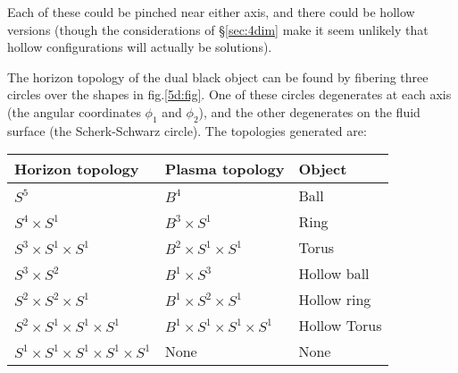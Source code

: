 Each of these could be pinched near either axis, and there could be
hollow versions (though the considerations of \S\ref{sec:4dim} make
it seem unlikely that hollow configurations will actually be
solutions).




The horizon topology of the dual black object can be found by
fibering three circles over the shapes in fig.\ref{5d:fig}. One of
these circles degenerates at each axis (the angular coordinates
$\phi_1$ and $\phi_2$), and the other degenerates on the fluid
surface (the Scherk-Schwarz circle). The topologies generated are:
%
%
%
  \begin{center}
  \begin{tabular}{|l|l|l|}
    \hline
    Horizon topology & Plasma topology & Object \\
    \hline
    $S^5$                     & $B^4$                     & Ball \\
    $S^4\times S^1$           & $B^3\times S^1$           & Ring \\
    $S^3\times S^1\times S^1$ & $B^2\times S^1\times S^1$ & Torus \\
    $S^3\times S^2$           & $B^1\times S^3$           & Hollow ball \\
    $S^2\times S^2\times S^1$ & $B^1\times S^2\times S^1$ & Hollow ring \\
    $S^2\times S^1\times S^1\times S^1$
                              & $B^1\times S^1\times S^1\times S^1$
                                                          & Hollow Torus \\
    $S^1\times S^1\times S^1\times S^1\times S^1$
                              & None                      & None \\
    \hline
  \end{tabular}
  \end{center}
